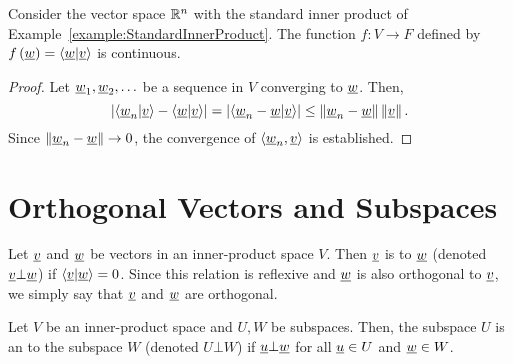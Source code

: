 
\begin{theorem}
\label{theorem:InnerProductContinuous}
Consider the vector space $\mathbb{R}^n$ with the standard inner product of Example~\ref{example:StandardInnerProduct}.
The function $f: V \rightarrow F$ defined by $f \left( \underline{w} \right) = \left\langle \underline{w} | \underline{v} \right\rangle$ is continuous.
\end{theorem}
\begin{proof}
Let $\underline{w}_1, \underline{w}_2, \ldots$ be a sequence in $V$ converging to $\underline{w}$.
Then,
\begin{equation*}
\left| \left\langle \underline{w}_n | \underline{v} \right\rangle
- \left\langle \underline{w} | \underline{v} \right\rangle \right|
= \left| \left\langle \underline{w}_n - \underline{w} | \underline{v} \right\rangle \right|
\leq \left\| \underline{w}_n - \underline{w} \right\| \left\| \underline{v} \right\|.
\end{equation*}
Since $\left\| \underline{w}_n - \underline{w} \right\| \rightarrow 0$, the convergence of $\left\langle \underline{w}_n, \underline{v} \right\rangle$ is established.
\end{proof}


\section{Orthogonal Vectors and Subspaces}

\begin{definition}
Let $\underline{v}$ and $\underline{w}$ be vectors in an inner-product space $V$.
Then $\underline{v}$ is  to $\underline{w}$ (denoted $\underline{v} \bot \underline{w}$) if $\left\langle \underline{v} | \underline{w} \right\rangle = 0$.
Since this relation is reflexive and $\underline{w}$ is also orthogonal to $\underline{v}$, we simply say that $\underline{v}$ and $\underline{w}$ are orthogonal.
\end{definition}

\begin{definition}
Let $V$ be an inner-product space and $U,W$ be subspaces.
Then, the subspace $U$ is an  to the subspace $W$ (denoted $U \bot W$) if $\underline{u} \bot \underline{w}$ for all $\underline{u}\in U$ and $\underline{w}\in W$.
\end{definition}

